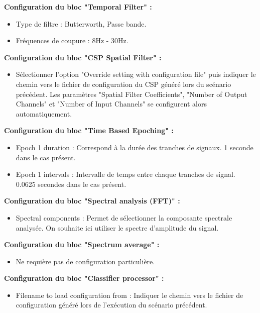 \smallbreak
\textbf{Configuration du bloc "Temporal Filter" : }
\smallbreak
\begin{itemize}
	\item Type de filtre : Butterworth, Passe bande.
	\smallbreak
	\item Fréquences de coupure : 8Hz - 30Hz.
\end{itemize}

\smallbreak
\textbf{Configuration du bloc "CSP Spatial Filter" : }
\smallbreak
\begin{itemize}
	\item Sélectionner l'option "Override setting with configuration file" puis indiquer le chemin vers le fichier de configuration du CSP généré lors du scénario précédent. Les paramètres "Spatial Filter Coefficients", "Number of Output Channels" et "Number of Input Channels" se configurent alors automatiquement. 
\end{itemize}

\smallbreak
\textbf{Configuration du bloc "Time Based Epoching" : }
\smallbreak
\begin{itemize}
	\item Epoch 1 duration : Correspond à la durée des tranches de signaux. 1 seconde dans le cas présent.
	\smallbreak
	\item Epoch 1 intervals : Intervalle de temps entre chaque tranches de signal. 0.0625 secondes dans le cas présent. 
\end{itemize}

\smallbreak
\textbf{Configuration du bloc "Spectral analysis (FFT)" : }
\smallbreak
\begin{itemize}
	\item Spectral components : Permet de sélectionner la composante spectrale analysée. On souhaite ici utiliser le spectre d'amplitude du signal. 
\end{itemize}

\smallbreak
\textbf{Configuration du bloc "Spectrum average" : }
\smallbreak
\begin{itemize}
	\item Ne requière pas de configuration particulière.
\end{itemize}

\smallbreak
\textbf{Configuration du bloc "Classifier processor" : }
\smallbreak
\begin{itemize}
	\item Filename to load configuration from : Indiquer le chemin vers le fichier de configuration généré lors de l'exécution du scénario précédent.
\end{itemize}

